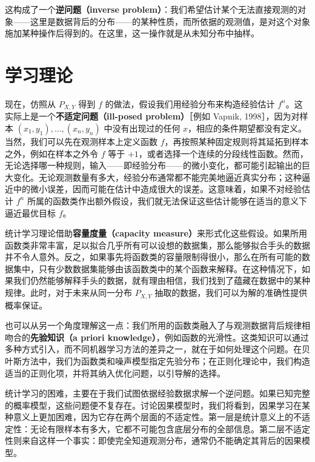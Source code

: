 这构成了一个\textbf{逆问题（inverse problem）}：我们希望估计某个无法直接观测的对象——这里是数据背后的分布——的某种性质，而所依据的观测值，是对这个对象施加某种操作后得到的。在这里，这一操作就是从未知分布中抽样。

\section{学习理论}
\label{sec:learning-theory}

现在，仿照从 $P_{X,Y}$ 得到 $f$ 的做法，假设我们用经验分布来构造经验估计 $f^n$。这实际上是一个\textbf{不适定问题（ill-posed problem）}［例如 Vapnik, 1998］，因为对样本 $(x_1,y_1),\ldots,(x_n,y_n)$ 中没有出现过的任何 $x$，相应的条件期望都没有定义。当然，我们可以先在观测样本上定义函数 $f$，再按照某种固定规则将其延拓到样本之外，例如在样本之外令 $f$ 等于 $+1$，或者选择一个连续的分段线性函数。然而，无论选择哪一种规则，输入——即经验分布——的微小变化，都可能引起输出的巨大变化。无论观测数量有多大，经验分布通常都不能完美地逼近真实分布；这种逼近中的微小误差，因而可能在估计中造成很大的误差。这意味着，如果不对经验估计 $f^n$ 所属的函数类作出额外假设，我们就无法保证这些估计能够在适当的意义下逼近最优目标 $f$。

统计学习理论借助\textbf{容量度量（capacity measure）}来形式化这些假设。如果所用函数类非常丰富，足以拟合几乎所有可以设想的数据集，那么能够拟合手头的数据并不令人意外。反之，如果事先将函数类的容量限制得很小，那么在所有可能的数据集中，只有少数数据集能够由该函数类中的某个函数来解释。在这种情况下，如果我们仍然能够解释手头的数据，就有理由相信，我们找到了蕴藏在数据中的某种规律。此时，对于未来从同一分布 $P_{X,Y}$ 抽取的数据，我们可以为解的准确性提供概率保证。

也可以从另一个角度理解这一点：我们所用的函数类融入了与观测数据背后规律相吻合的\textbf{先验知识（a priori knowledge）}，例如函数的光滑性。这类知识可以通过多种方式引入，而不同机器学习方法的差异之一，就在于如何处理这个问题。在贝叶斯方法中，我们为函数类和噪声模型指定先验分布；在正则化理论中，我们构造适当的正则化项，并将其纳入优化问题，以引导解的选择。

统计学习的困难，主要在于我们试图依据经验数据求解一个逆问题。如果已知完整的概率模型，这些问题便不复存在。讨论因果模型时，我们将看到，因果学习在某种意义上更加困难，因为它存在两个层面的不适定性。第一层是统计意义上的不适定性：无论有限样本有多大，它都不可能包含底层分布的全部信息。第二层不适定性则来自这样一个事实：即使完全知道观测分布，通常仍不能确定其背后的因果模型。

